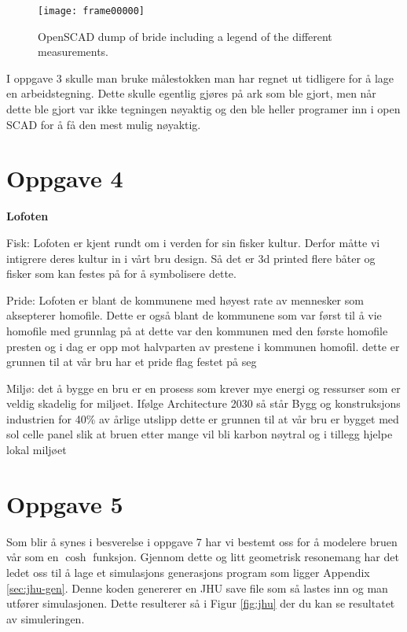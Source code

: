 \documentclass{report}
\begin{document}
\begin{figure}[t]
	\centering
	\texttt{[image: frame00000]}

	\caption {OpenSCAD dump of bride including a legend of the different measurements.}
	\label{fig:bridge}
\end{figure}

I oppgave 3 skulle man bruke målestokken man har regnet ut tidligere for å lage en arbeidstegning. Dette skulle egentlig gjøres på ark som ble gjort, men når dette ble gjort var ikke tegningen nøyaktig og den ble heller programer inn i open SCAD for å få den mest mulig nøyaktig.

\section{Oppgave 4}

\textbf {Lofoten}

Fisk: Lofoten er kjent rundt om i verden for sin fisker kultur. Derfor måtte vi intigrere deres kultur in i vårt bru design. Så det er 3d printed flere båter og fisker som kan festes på for å symbolisere dette.

Pride: Lofoten er blant de kommunene med høyest rate av mennesker som aksepterer homofile. Dette er også blant de kommunene som var først til å vie homofile med grunnlag på at dette var den kommunen med den første homofile presten og i dag er opp mot halvparten av prestene i kommunen homofil. dette er grunnen til at vår bru har et pride flag festet på seg

Miljø: det å bygge en bru er en prosess som krever mye energi og ressurser som er veldig skadelig for miljøet. Ifølge Architecture 2030 så står Bygg og konstruksjons industrien for 40\% av årlige utslipp dette er grunnen til at vår bru er bygget med sol celle panel slik at bruen etter mange vil bli karbon nøytral og i tillegg hjelpe lokal miljøet

\section{Oppgave 5}

Som blir å synes i besverelse i oppgave 7 har vi bestemt oss for å modelere bruen vår som en $\cosh$ funksjon. Gjennom dette og litt geometrisk resonemang har det ledet oss til å lage et simulasjons generasjons program som ligger Appendix \ref{sec:jhu-gen}. Denne koden genererer en JHU save file som så lastes inn og man utfører simulasjonen. Dette resulterer så i Figur \ref{fig:jhu} der du kan se resultatet av simuleringen.
\end{document}
